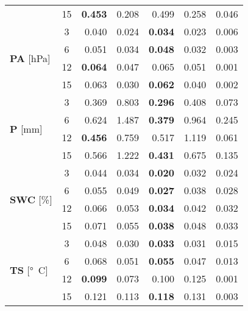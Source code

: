 \begin{table}
\begin{tabular}{p{2.1cm}c|rr|rr|r}
 & 15 & \bfseries 0.453 & 0.208 & 0.499 & 0.258 & 0.046 \\
\cline{1-7}
\multirow[c]{4}{*}{\parbox{2.1cm}{\textbf{PA} [\si{hPa}]}} & 3 & 0.040 & 0.024 & \bfseries 0.034 & 0.023 & 0.006 \\
 & 6 & 0.051 & 0.034 & \bfseries 0.048 & 0.032 & 0.003 \\
 & 12 & \bfseries 0.064 & 0.047 & 0.065 & 0.051 & 0.001 \\
 & 15 & 0.063 & 0.030 & \bfseries 0.062 & 0.040 & 0.002 \\
\cline{1-7}
\multirow[c]{4}{*}{\parbox{2.1cm}{\textbf{P} [\si{mm}]}} & 3 & 0.369 & 0.803 & \bfseries 0.296 & 0.408 & 0.073 \\
 & 6 & 0.624 & 1.487 & \bfseries 0.379 & 0.964 & 0.245 \\
 & 12 & \bfseries 0.456 & 0.759 & 0.517 & 1.119 & 0.061 \\
 & 15 & 0.566 & 1.222 & \bfseries 0.431 & 0.675 & 0.135 \\
\cline{1-7}
\multirow[c]{4}{*}{\parbox{2.1cm}{\textbf{SWC} [\si{\%}]}} & 3 & 0.044 & 0.034 & \bfseries 0.020 & 0.032 & 0.024 \\
 & 6 & 0.055 & 0.049 & \bfseries 0.027 & 0.038 & 0.028 \\
 & 12 & 0.066 & 0.053 & \bfseries 0.034 & 0.042 & 0.032 \\
 & 15 & 0.071 & 0.055 & \bfseries 0.038 & 0.048 & 0.033 \\
\cline{1-7}
\multirow[c]{4}{*}{\parbox{2.1cm}{\textbf{TS} [\si{°C}]}} & 3 & 0.048 & 0.030 & \bfseries 0.033 & 0.031 & 0.015 \\
 & 6 & 0.068 & 0.051 & \bfseries 0.055 & 0.047 & 0.013 \\
 & 12 & \bfseries 0.099 & 0.073 & 0.100 & 0.125 & 0.001 \\
 & 15 & 0.121 & 0.113 & \bfseries 0.118 & 0.131 & 0.003 \\
\cline{1-7}
\bottomrule
\end{tabular}
\end{table}
